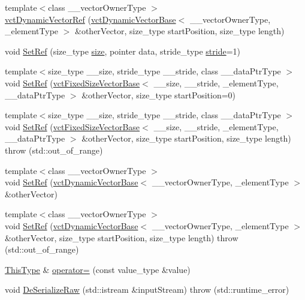 \begin{DoxyCompactItemize}
\item 
{\footnotesize template$<$class \+\_\+\+\_\+vector\+Owner\+Type $>$ }\\\hyperlink{classvct_dynamic_vector_ref_aa36b799a85eec00fb811c78de50e74b8}{vct\+Dynamic\+Vector\+Ref} (\hyperlink{classvct_dynamic_vector_base}{vct\+Dynamic\+Vector\+Base}$<$ \+\_\+\+\_\+vector\+Owner\+Type, \+\_\+element\+Type $>$ \&other\+Vector, size\+\_\+type start\+Position, size\+\_\+type length)
\item 
void \hyperlink{classvct_dynamic_vector_ref_aafa4ebcfe74bf97ca55f902f8864722f}{Set\+Ref} (size\+\_\+type \hyperlink{classvct_dynamic_const_vector_base_a79950d8cced7fd4e790d9ac2ca1c43a7}{size}, pointer data, stride\+\_\+type \hyperlink{classvct_dynamic_const_vector_base_af0440ce847480b353e9f85edccc03158}{stride}=1)
\item 
{\footnotesize template$<$size\+\_\+type \+\_\+\+\_\+size, stride\+\_\+type \+\_\+\+\_\+stride, class \+\_\+\+\_\+data\+Ptr\+Type $>$ }\\void \hyperlink{classvct_dynamic_vector_ref_af452defc85575d5c5d2db08bd3b24efb}{Set\+Ref} (\hyperlink{classvct_fixed_size_vector_base}{vct\+Fixed\+Size\+Vector\+Base}$<$ \+\_\+\+\_\+size, \+\_\+\+\_\+stride, \+\_\+element\+Type, \+\_\+\+\_\+data\+Ptr\+Type $>$ \&other\+Vector, size\+\_\+type start\+Position=0)
\item 
{\footnotesize template$<$size\+\_\+type \+\_\+\+\_\+size, stride\+\_\+type \+\_\+\+\_\+stride, class \+\_\+\+\_\+data\+Ptr\+Type $>$ }\\void \hyperlink{classvct_dynamic_vector_ref_a5233ced95b3c4eb5e4c0e433da0d52b0}{Set\+Ref} (\hyperlink{classvct_fixed_size_vector_base}{vct\+Fixed\+Size\+Vector\+Base}$<$ \+\_\+\+\_\+size, \+\_\+\+\_\+stride, \+\_\+element\+Type, \+\_\+\+\_\+data\+Ptr\+Type $>$ \&other\+Vector, size\+\_\+type start\+Position, size\+\_\+type length)  throw (std\+::out\+\_\+of\+\_\+range)
\item 
{\footnotesize template$<$class \+\_\+\+\_\+vector\+Owner\+Type $>$ }\\void \hyperlink{classvct_dynamic_vector_ref_afb5c094aeb369314d69925a5307c5e1c}{Set\+Ref} (\hyperlink{classvct_dynamic_vector_base}{vct\+Dynamic\+Vector\+Base}$<$ \+\_\+\+\_\+vector\+Owner\+Type, \+\_\+element\+Type $>$ \&other\+Vector)
\item 
{\footnotesize template$<$class \+\_\+\+\_\+vector\+Owner\+Type $>$ }\\void \hyperlink{classvct_dynamic_vector_ref_abf288f528fde8390d6da37f4cd70c1ac}{Set\+Ref} (\hyperlink{classvct_dynamic_vector_base}{vct\+Dynamic\+Vector\+Base}$<$ \+\_\+\+\_\+vector\+Owner\+Type, \+\_\+element\+Type $>$ \&other\+Vector, size\+\_\+type start\+Position, size\+\_\+type length)  throw (std\+::out\+\_\+of\+\_\+range)
\item 
\hyperlink{classvct_dynamic_vector_ref_adde8a247e72c476120c26cfa15a37c6d}{This\+Type} \& \hyperlink{classvct_dynamic_vector_ref_a9c5f2236e7f922e4641f8c67d12f5fa5}{operator=} (const value\+\_\+type \&value)
\item 
void \hyperlink{classvct_dynamic_vector_ref_aba3385123199939ab0678859b2f7f072}{De\+Serialize\+Raw} (std\+::istream \&input\+Stream)  throw (std\+::runtime\+\_\+error)
\end{DoxyCompactItemize}
